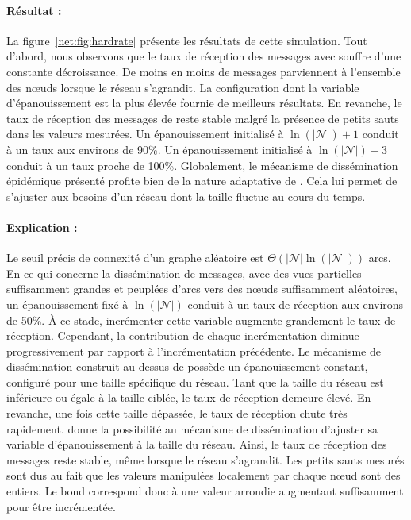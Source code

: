 \paragraph{Résultat :} La figure~\ref{net:fig:hardrate} présente les résultats
de cette simulation. Tout d'abord, nous observons que le taux de réception des
messages avec \CYCLON souffre d'une constante décroissance. De moins en moins de
messages parviennent à l'ensemble des nœuds lorsque le réseau s'agrandit. La
configuration dont la variable d'épanouissement est la plus élevée fournie de
meilleurs résultats. En revanche, le taux de réception des messages de \SPRAY
reste stable malgré la présence de petits sauts dans les valeurs mesurées. Un
épanouissement initialisé à $\ln(|\mathcal{N}|)+1$ conduit à un taux aux
environs de 90\%. Un épanouissement initialisé à $\ln(|\mathcal{N}|)+3$ conduit
à un taux proche de 100\%. Globalement, le mécanisme de dissémination épidémique
présenté profite bien de la nature adaptative de \SPRAY. Cela lui permet de
s'ajuster aux besoins d'un réseau dont la taille fluctue au cours du temps.

\paragraph{Explication :} Le seuil précis de connexité d'un graphe aléatoire est
$\Theta(|\mathcal{N}|\ln(|\mathcal{N}|))$ arcs. En ce qui concerne la
dissémination de messages, avec des vues partielles suffisamment grandes et
peuplées d'arcs vers des nœuds suffisamment aléatoires, un épanouissement fixé à
$\ln(|\mathcal{N}|)$ conduit à un taux de réception aux environs de 50\%. À ce
stade, incrémenter cette variable augmente grandement le taux de
réception. Cependant, la contribution de chaque incrémentation diminue
progressivement par rapport à l'incrémentation précédente. Le mécanisme de
dissémination construit au dessus de \CYCLON possède un épanouissement constant,
configuré pour une taille spécifique du réseau. Tant que la taille du réseau est
inférieure ou égale à la taille ciblée, le taux de réception demeure élevé. En
revanche, une fois cette taille dépassée, le taux de réception chute très
rapidement. \SPRAY donne la possibilité au mécanisme de dissémination d'ajuster
sa variable d'épanouissement à la taille du réseau. Ainsi, le taux de réception
des messages reste stable, même lorsque le réseau s'agrandit. Les petits sauts
mesurés sont dus au fait que les valeurs manipulées localement par chaque nœud
sont des entiers. Le bond correspond donc à une valeur arrondie augmentant
suffisamment pour être incrémentée.

